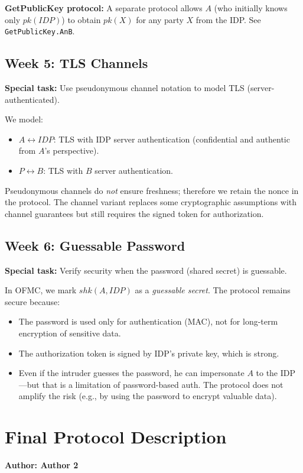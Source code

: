 \documentclass[11pt,a4paper]{article}
\begin{document}
\textbf{GetPublicKey protocol:} A separate protocol allows $A$ (who initially knows only $\mathit{pk}(\mathit{IDP})$) to obtain $\mathit{pk}(X)$ for any party $X$ from the IDP. See \texttt{GetPublicKey.AnB}.

\subsection{Week 5: TLS Channels}

\textbf{Special task:} Use pseudonymous channel notation to model TLS (server-authenticated).

We model:
\begin{itemize}
  \item $A \leftrightarrow \mathit{IDP}$: TLS with IDP server authentication (confidential and authentic from $A$'s perspective).
  \item $P \leftrightarrow B$: TLS with $B$ server authentication.
\end{itemize}

Pseudonymous channels do \emph{not} ensure freshness; therefore we retain the nonce in the protocol. The channel variant replaces some cryptographic assumptions with channel guarantees but still requires the signed token for authorization.

\subsection{Week 6: Guessable Password}

\textbf{Special task:} Verify security when the password (shared secret) is guessable.

In OFMC, we mark $shk(A,\mathit{IDP})$ as a \emph{guessable secret}. The protocol remains secure because:
\begin{itemize}
  \item The password is used only for authentication (MAC), not for long-term encryption of sensitive data.
  \item The authorization token is signed by IDP's private key, which is strong.
  \item Even if the intruder guesses the password, he can impersonate $A$ to the IDP---but that is a limitation of password-based auth. The protocol does not amplify the risk (e.g., by using the password to encrypt valuable data).
\end{itemize}

\hrulefill

\section{Final Protocol Description}
\textbf{Author: Author 2}
\end{document}
